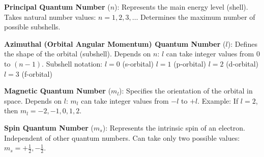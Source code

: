 \documentclass[openany]{book}
\begin{document}
\begin{outline}
	\1 \textbf{Principal Quantum Number} ($n$):  
	\2 Represents the main energy level (shell).
	\2 Takes natural number values: $n = 1, 2, 3, \dots$
	\2 Determines the maximum number of possible subshells.
	
	\1 \textbf{Azimuthal (Orbital Angular Momentum) Quantum Number} ($l$):  
	\2 Defines the shape of the orbital (subshell).
	\2 Depends on $n$: $l$ can take integer values from $0$ to $(n-1)$.
	\2 Subshell notation:  
	\3 $l = 0$ (s-orbital)
	\3 $l = 1$ (p-orbital)
	\3 $l = 2$ (d-orbital)
	\3 $l = 3$ (f-orbital)
	
	\1 \textbf{Magnetic Quantum Number} ($m_l$):  
	\2 Specifies the orientation of the orbital in space.
	\2 Depends on $l$: $m_l$ can take integer values from $-l$ to $+l$.  
	\2 Example: If $l = 2$, then $m_l = -2, -1, 0, 1, 2$.
	
	\1 \textbf{Spin Quantum Number} ($m_s$):  
	\2 Represents the intrinsic spin of an electron.
	\2 Independent of other quantum numbers.
	\2 Can take only two possible values: $m_s = +\frac{1}{2}, -\frac{1}{2}$.
\end{outline}

\end{document}
